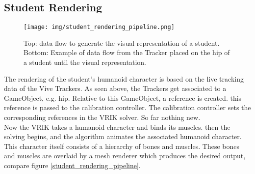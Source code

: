 \subsection{Student Rendering}
\begin{figure}
	\centering
	\texttt{[image: img/student\_rendering\_pipeline.png]}
	\caption{Top: data flow to generate the visual representation of a student. Bottom: Example of data flow from the Tracker placed on the hip of a student until the visual representation.}
	\label{fig:student_rendering_pipeline}
\end{figure}
The rendering of the student's humanoid character is based on the live tracking data of the Vive Trackers. As seen above, the Trackers get associated to a GameObject, e.g. hip. Relative to this GameObject, a reference is created. this reference is passed to the calibration controller. The calibration controller sets the corresponding references in the VRIK solver. So far nothing new.\\
Now the VRIK takes a humanoid character and binds its muscles. then the solving begins, and the algorithm animates the associated humanoid character. This character itself consists of a hierarchy of bones and muscles. These bones and muscles are overlaid by a mesh renderer which produces the desired output, compare figure \ref{student_rendering_pipeline}.

